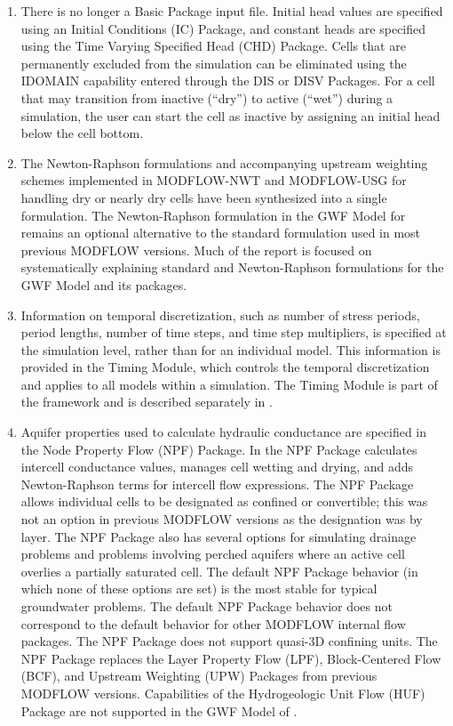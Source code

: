 \begin{enumerate}
\item There is no longer a Basic Package input file.  Initial head values are specified using an Initial Conditions (IC) Package, and constant heads are specified using the Time Varying Specified Head (CHD) Package.  Cells that are permanently excluded from the simulation can be eliminated using the IDOMAIN capability entered through the DIS or DISV Packages.  For a cell that may transition from inactive (``dry'') to active (``wet'') during a simulation, the user can start the cell as inactive by assigning an initial head below the cell bottom.

\item The Newton-Raphson formulations and accompanying upstream weighting schemes implemented in MODFLOW-NWT and MODFLOW-USG for handling dry or nearly dry cells have been synthesized into a single formulation.  The Newton-Raphson formulation in the GWF Model for \mf remains an optional alternative to the standard formulation used in most previous MODFLOW versions. Much of the \cite{modflow6gwf} report is focused on systematically explaining standard and Newton-Raphson formulations for the GWF Model and its packages.

\item Information on temporal discretization, such as number of stress periods, period lengths, number of time steps, and time step multipliers, is specified at the simulation level, rather than for an individual model.  This information is provided in the Timing Module, which controls the temporal discretization and applies to all models within a simulation.  The Timing Module is part of the \mf framework and is described separately in \cite{modflow6framework}.

\item Aquifer properties used to calculate hydraulic conductance are specified in the Node Property Flow (NPF) Package.  In \mfcomma the NPF Package calculates intercell conductance values, manages cell wetting and drying, and adds Newton-Raphson terms for intercell flow expressions.  The NPF Package allows individual cells to be designated as confined or convertible; this was not an option in previous MODFLOW versions as the designation was by layer.  The NPF Package also has several options for simulating drainage problems and problems involving perched aquifers where an active cell overlies a partially saturated cell.  The default NPF Package behavior (in which none of these options are set) is the most stable for typical groundwater problems.  The default NPF Package behavior does not correspond to the default behavior for other MODFLOW internal flow packages.  The NPF Package does not support quasi-3D confining units.  The NPF Package replaces the Layer Property Flow (LPF), Block-Centered Flow (BCF), and Upstream Weighting (UPW) Packages from previous MODFLOW versions.  Capabilities of the Hydrogeologic Unit Flow (HUF) Package \citep{anderman2000modflow, anderman2003modflow} are not supported in the GWF Model of \mf.


\end{enumerate}

